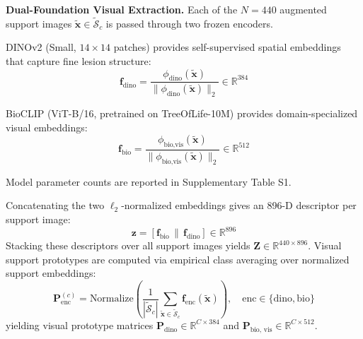 \documentclass[conference]{IEEEtran}
\begin{document}
\medskip
\textbf{Dual-Foundation Visual Extraction.} Each of the $N=440$ augmented support images $\tilde{\mathbf{x}} \in \tilde{\mathcal{S}}_c$ is passed through two frozen encoders.

DINOv2 (Small, $14 \times 14$ patches) \cite{oquab2023dinov2} provides self-supervised spatial embeddings that capture fine lesion structure:
\begin{equation}
    \mathbf{f}_{\text{dino}} = \frac{\phi_{\text{dino}}(\tilde{\mathbf{x}})}{\|\phi_{\text{dino}}(\tilde{\mathbf{x}})\|_2} \in \mathbb{R}^{384}
\end{equation}

BioCLIP (ViT-B/16, pretrained on TreeOfLife-10M) \cite{stevens2024bioclip} provides domain-specialized visual embeddings:
\begin{equation}
    \mathbf{f}_{\text{bio}} = \frac{\phi_{\text{bio,vis}}(\tilde{\mathbf{x}})}{\|\phi_{\text{bio,vis}}(\tilde{\mathbf{x}})\|_2} \in \mathbb{R}^{512}
\end{equation}

Model parameter counts are reported in Supplementary Table S1.

Concatenating the two $\ell_2$-normalized embeddings gives an 896-D descriptor per support image:
\begin{equation}
    \mathbf{z} = \left[\mathbf{f}_{\text{bio}} \,\|\, \mathbf{f}_{\text{dino}}\right] \in \mathbb{R}^{896}
\end{equation}
Stacking these descriptors over all support images yields $\mathbf{Z} \in \mathbb{R}^{440 \times 896}$. Visual support prototypes are computed via empirical class averaging over normalized support embeddings:
\begin{equation}
    \mathbf{P}_{\text{enc}}^{(c)} = \text{Normalize}\left(\frac{1}{|\tilde{\mathcal{S}}_c|}\sum_{\tilde{\mathbf{x}} \in \tilde{\mathcal{S}}_c} \mathbf{f}_{\text{enc}}(\tilde{\mathbf{x}})\right), \quad \text{enc} \in \{\text{dino}, \text{bio}\}
\end{equation}
yielding visual prototype matrices $\mathbf{P}_{\text{dino}} \in \mathbb{R}^{C \times 384}$ and $\mathbf{P}_{\text{bio, vis}} \in \mathbb{R}^{C \times 512}$.
\end{document}

